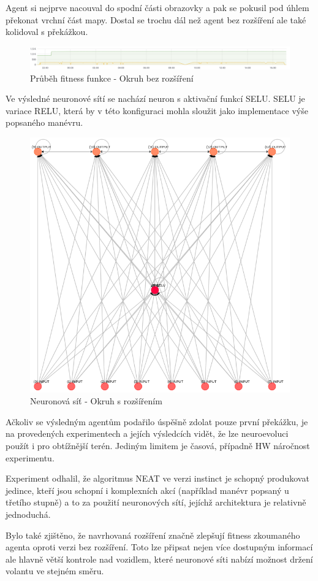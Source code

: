 Agent si nejprve nacouval do spodní části obrazovky a pak se pokusil pod úhlem překonat vrchní část mapy. Dostal se trochu dál než agent bez rozšíření ale také kolidoval s překážkou.
\begin{figure}[H]
	\centering
	\includegraphics[width=0.5\linewidth]{solutions/Iadvanced/advancedGraph}
	\caption{Průběh fitness funkce - Okruh bez rozšíření}
	\label{fig:advancedgraph}
\end{figure}
Ve výsledné neuronové sítí se nachází neuron s aktivační funkcí SELU. SELU je variace RELU, která by v této konfiguraci mohla sloužit jako implementace výše popsaného manévru.
\begin{figure}[H]
	\centering
	\includegraphics[width=0.5\linewidth]{solutions/Iadvanced/advanced}
	\caption{Neuronová síť - Okruh s rozšířením}
	\label{fig:advanced}
\end{figure}

Ačkoliv se výsledným agentům podařilo úspěšně zdolat pouze první překážku, je na provedených experimentech a jejích výsledcích vidět, že lze neuroevoluci použít i pro obtížnější terén. Jediným limitem je časová, případně HW náročnost experimentu.

Experiment odhalil, že algoritmus NEAT ve verzi instinct je schopný produkovat jedince, kteří jsou schopní i komplexních akcí (například manévr popsaný u třetího stupně) a to za použití neuronových sítí, jejíchž architektura je relativně jednoduchá. 

Bylo také zjištěno, že navrhovaná rozšíření značně zlepšují fitness zkoumaného agenta oproti verzi bez rozšíření. Toto lze připsat nejen více dostupným informací ale hlavně větší kontrole nad vozidlem, které neuronové síti nabízí možnost držení volantu ve stejném směru.

